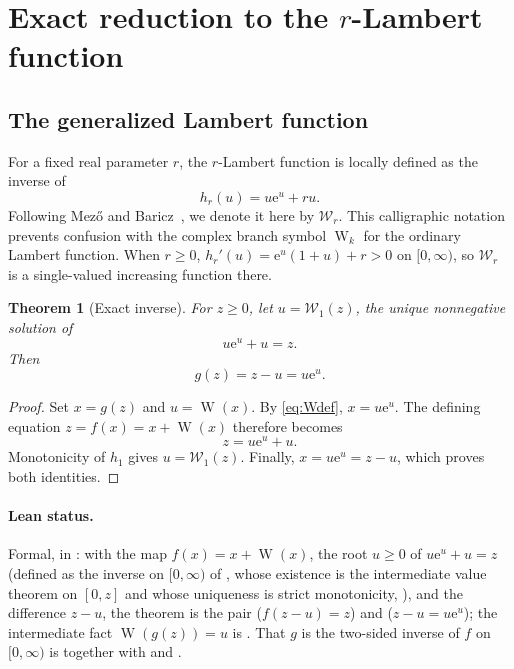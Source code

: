 \documentclass[11pt,oneside]{article}
\theoremstyle{plain}
\newtheorem{theorem}{Theorem}[section]
\theoremstyle{definition}
\theoremstyle{remark}
\newcommand{\W}{\operatorname{W}}
\newcommand{\rW}{\mathcal{W}}
\newcommand{\e}{\mathrm{e}}
\begin{document}
\section{Exact reduction to the \texorpdfstring{\(r\)-Lambert}{r-Lambert} function}
\label{sec:exact}

\subsection{The generalized Lambert function}

For a fixed real parameter \(r\), the \(r\)-Lambert function is locally defined
as the inverse of
\begin{equation}
 h_r(u)=u\e^u+ru.
 \label{eq:rLambert-def}
\end{equation}
Following Mez\H{o} and Baricz~\cite{MezoBaricz2017}, we denote it here by
\(\rW_r\).  This calligraphic notation prevents confusion with the complex
branch symbol \(\W_k\) for the ordinary Lambert function.  When \(r\ge0\),
\(h_r'(u)=\e^u(1+u)+r>0\) on \([0,\infty)\), so \(\rW_r\) is a single-valued
increasing function there.

\begin{theorem}[Exact inverse]
\label{thm:exact-inverse}
For \(z\ge0\), let \(u=\rW_1(z)\), the unique nonnegative solution of
\begin{equation}
 u\e^u+u=z.
 \label{eq:u-equation}
\end{equation}
Then
\begin{equation}
 \boxed{\quad g(z)=z-u=u\e^u.\quad}
 \label{eq:g-exact}
\end{equation}
\end{theorem}

\begin{proof}
Set \(x=g(z)\) and \(u=\W(x)\).  By \eqref{eq:Wdef}, \(x=u\e^u\).  The
defining equation \(z=f(x)=x+\W(x)\) therefore becomes
\[
 z=u\e^u+u.
\]
Monotonicity of \(h_1\) gives \(u=\rW_1(z)\).  Finally,
\(x=u\e^u=z-u\), which proves both identities.
\end{proof}

\paragraph{Lean status.}
Formal, in : with  the map
\(f(x)=x+\W(x)\),  the root \(u\ge0\) of \(u\e^u+u=z\)
(defined as the inverse on \([0,\infty)\) of , whose existence is
the intermediate value theorem on \([0,z]\) and whose uniqueness is strict monotonicity,
), and  the difference
\(z-u\), the theorem is the pair 
(\(f(z-u)=z\)) and  (\(z-u=u\e^u\)); the
intermediate fact \(\W(g(z))=u\) is .  That
\(g\) is the two-sided inverse of \(f\) on \([0,\infty)\) is
 together with
 and .
\end{document}
